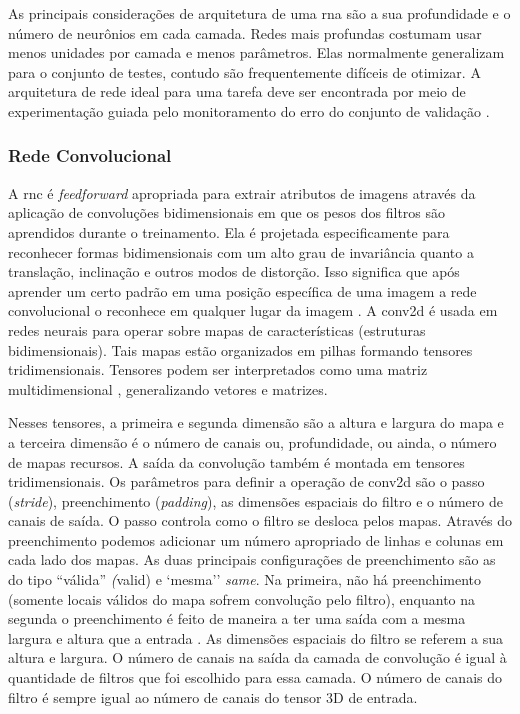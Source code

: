 As principais considerações de arquitetura de uma \acrshort{rna} são a sua profundidade e o número de neurônios em cada camada. Redes mais profundas costumam usar  menos unidades por camada e menos parâmetros. Elas normalmente generalizam para o conjunto de testes, contudo são frequentemente difíceis de otimizar. A arquitetura de rede ideal para uma tarefa deve ser encontrada por meio de experimentação guiada pelo monitoramento do erro do conjunto de validação \cite{Goodfellow2016}.


\subsubsection{Rede Convolucional}

A \gls{rnc} é \textit{feedforward} apropriada para extrair atributos de imagens através da aplicação de convoluções bidimensionais em que os pesos dos filtros são aprendidos durante o treinamento. Ela é projetada especificamente para reconhecer formas bidimensionais com um alto grau de invariância quanto a translação, inclinação e outros modos de distorção. Isso significa que após aprender um certo padrão em uma posição específica de uma imagem a rede convolucional o reconhece em qualquer lugar da imagem \cite{Haykin}. 
A \gls{conv2d} é usada  em redes neurais para operar sobre mapas de características (estruturas  bidimensionais). Tais mapas estão organizados em pilhas formando tensores tridimensionais. Tensores podem ser interpretados como uma matriz multidimensional \cite{geron2017hands}, generalizando vetores e matrizes.  

Nesses tensores, a primeira e segunda dimensão são a altura e largura do mapa e a terceira dimensão é o número de canais ou, profundidade, ou ainda, o número de mapas recursos. A saída da convolução também é montada em tensores tridimensionais.
Os parâmetros para definir a operação de \acrshort{conv2d} são o passo (\textit{stride}), preenchimento (\textit{padding}), as dimensões espaciais do filtro e o número de canais de saída. O passo controla como o filtro se desloca pelos mapas. 
Através do preenchimento podemos adicionar um número apropriado de linhas e colunas em cada lado dos mapas. 
As duas principais configurações de preenchimento são as do tipo ``válida'' \textit(valid) e `mesma'' \textit{same}. Na primeira, não há preenchimento (somente locais válidos do mapa sofrem convolução pelo filtro), enquanto na segunda o preenchimento é feito de maneira a ter uma saída com a mesma largura e altura que a entrada \cite{FrancoisDeepLearning}. 
As dimensões espaciais do filtro se referem a sua altura e largura. O número de canais na saída da camada de convolução é igual à quantidade de filtros que foi escolhido para essa camada. O número de canais do filtro é sempre igual ao número de canais do tensor 3D de entrada. 

